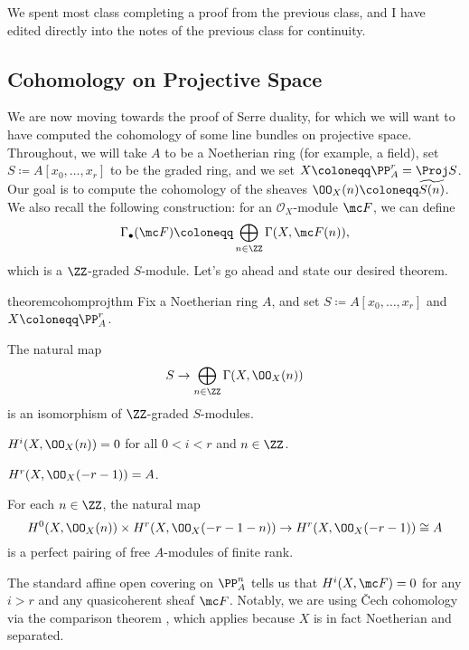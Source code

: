 \documentclass[../notes.tex]{subfiles}
\begin{document}
We spent most class completing a proof from the previous class, and I have edited directly into the notes of the previous class for continuity.

\subsection{Cohomology on Projective Space}
We are now moving towards the proof of Serre duality, for which we will want to have computed the cohomology of some line bundles on projective space. Throughout, we will take $A$ to be a Noetherian ring (for example, a field), set $S\coloneqq A[x_0,\ldots,x_r]$ to be the graded ring, and we set $X\coloneqq\PP^r_A=\Proj S$. Our goal is to compute the cohomology of the sheaves $\OO_X(n)\coloneqq\widetilde{S(n)}$. We also recall the following construction: for an $\mathcal O_X$-module $\mc F$, we can define
\[\Gamma_\bullet(\mc F)\coloneqq\bigoplus_{n\in\ZZ}\Gamma(X,\mc F(n)),\]
which is a $\ZZ$-graded $S$-module. Let's go ahead and state our desired theorem.
\begin{restatable}{theorem}{cohomprojthm} \label{thm:cohom-proj-space}
	Fix a Noetherian ring $A$, and set $S\coloneqq A[x_0,\ldots,x_r]$ and $X\coloneqq\PP^r_A$.
	\begin{listalph}
		\item The natural map
		\[S\to\bigoplus_{n\in\ZZ}\Gamma(X,\OO_X(n))\]
		is an isomorphism of $\ZZ$-graded $S$-modules.
		\item $H^i(X,\OO_X(n))=0$ for all $0<i<r$ and $n\in\ZZ$.
		\item $H^r(X,\OO_X(-r-1))=A$.
		\item For each $n\in\ZZ$, the natural map
		\[H^0(X,\OO_X(n))\times H^r(X,\OO_X(-r-1-n))\to H^r(X,\OO_X(-r-1))\cong A\]
		is a perfect pairing of free $A$-modules of finite rank.
	\end{listalph}
\end{restatable}
\begin{remark}
	The standard affine open covering on $\PP^n_A$ tells us that $H^i(X,\mc F)=0$ for any $i>r$ and any quasicoherent sheaf $\mc F$. Notably, we are using \v Cech cohomology via the comparison theorem , which applies because $X$ is in fact Noetherian and separated.
\end{remark}
\end{document}
